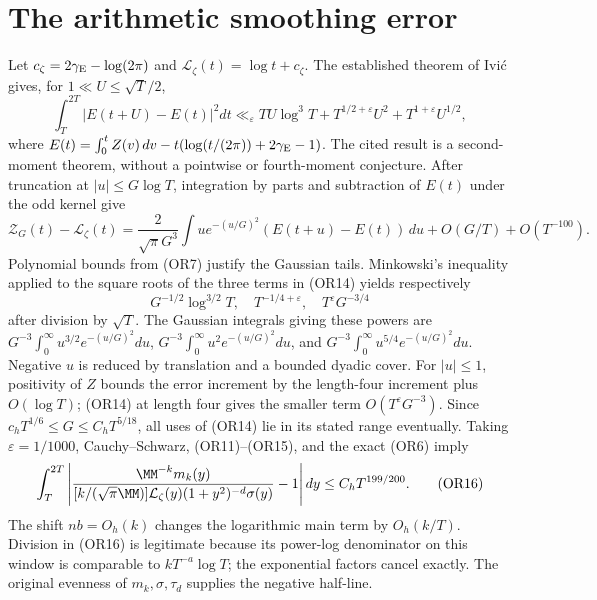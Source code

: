 \documentclass[11pt,a4paper]{article}
\begin{document}
\section{The arithmetic smoothing error}
Let \(c_\zeta=2\gamma_{\rm E}-\log(2\pi)\) and
\(\mathcal L_\zeta(t)=\log t+c_\zeta\).  The established theorem
of Ivi\'c \cite[Section 2, (2.1) and its stated \(E\)-analogue]{or:Ivic}
gives, for \(1\ll U\leq\sqrt T/2\),
\[
 \int_T^{2T}|E(t+U)-E(t)|^2dt
 \ll_\varepsilon TU\log^3 T+
 T^{1/2+\varepsilon}U^2+T^{1+\varepsilon}U^{1/2},       \tag{OR14}
\]
where \(E(t)=\int_0^tZ(v)\,dv-t(\log(t/(2\pi))+2\gamma_{\rm E}-1)\).
The cited result is a second-moment theorem, without a pointwise or
fourth-moment conjecture.
After truncation at \(|u|\leq G\log T\), integration by parts and
subtraction of \(E(t)\) under the odd kernel give
\[
 \mathcal Z_G(t)-\mathcal L_\zeta(t)
 =\frac2{\sqrt\pi G^3}\int
 u e^{-(u/G)^2}(E(t+u)-E(t))\,du+O(G/T)+O(T^{-100}).
 \tag{OR15}
\]
Polynomial bounds from (OR7) justify the Gaussian tails.  Minkowski's
inequality applied to the square roots of the three terms in
(OR14) yields respectively
\[
 G^{-1/2}\log^{3/2}T,\quad
 T^{-1/4+\varepsilon},\quad T^\varepsilon G^{-3/4}
\]
after division by \(\sqrt T\).  The Gaussian integrals giving these
powers are \(G^{-3}\int_0^\infty u^{3/2}e^{-(u/G)^2}du\),
\(G^{-3}\int_0^\infty u^2e^{-(u/G)^2}du\), and
\(G^{-3}\int_0^\infty u^{5/4}e^{-(u/G)^2}du\).
Negative \(u\) is reduced by translation and a bounded dyadic cover.
For \(|u|\leq1\), positivity of \(Z\) bounds the error increment by
the length-four increment plus \(O(\log T)\); (OR14) at length four
gives the smaller term \(O(T^\varepsilon G^{-3})\).
Since
\(c_hT^{1/6}\leq G\leq C_hT^{5/18}\), all uses of (OR14) lie in
its stated range eventually.  Taking \(\varepsilon=1/1000\),
Cauchy--Schwarz, (OR11)--(OR15), and the exact (OR6) imply
\[
 \int_T^{2T}\left|
 \frac{\MM^{-k}m_k(y)}
 { [k/(\sqrt\pi\MM)]\mathcal L_\zeta(y)(1+y^2)^{-d}\sigma(y)}
 -1\right|dy\leq C_hT^{199/200}.                      \tag{OR16}
\]
The shift \(nb=O_h(k)\) changes the logarithmic main term by
\(O_h(k/T)\).  Division in (OR16) is legitimate because its
power-log denominator on this window is comparable to
\(kT^{-a}\log T\); the exponential factors cancel exactly.
The original evenness of \(m_k,\sigma,\tau_d\) supplies the negative
half-line.
\end{document}
